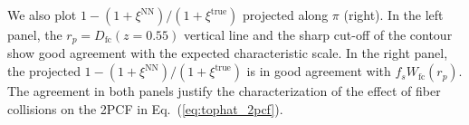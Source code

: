 \begin{figure*}
\begin{center}
{                                                                                                                                                                                                                                                                         We also plot $1 - (1 + \xi^\mathrm{NN})/(1+\xi^\mathrm{true})$
                                                                                                                                                                                                                                                                         projected along $\pi$ (right). In the left panel, the $r_p = D_\mathrm{fc}(z=0.55)$ 
                                                                                                                                                                                                                                                                         vertical line and the sharp cut-off of the contour show good agreement with the expected characteristic scale. 
                                                                                                                                                                                                                                                                         In the right panel, the projected $1 - (1 + \xi^\mathrm{NN})/(1+\xi^\mathrm{true})$
                                                                                                                                                                                                                                                                         is in good agreement with $f_s W_\mathrm{fc}(r_p)$. The agreement in both panels
                                                                                                                                                                                                                                                                         justify the characterization of the effect of fiber collisions on the 2PCF in 
                                                                                                                                                                                                                                                                         Eq.~(\ref{eq:tophat_2pcf}).}
                                                                                                                                                                                                                                                                         \label{fig:2pcf_tophat}
                                                                                                                                                                                                                                                                         \end{center}
                                                                                                                                                                                                                                                                         \end{figure*}
